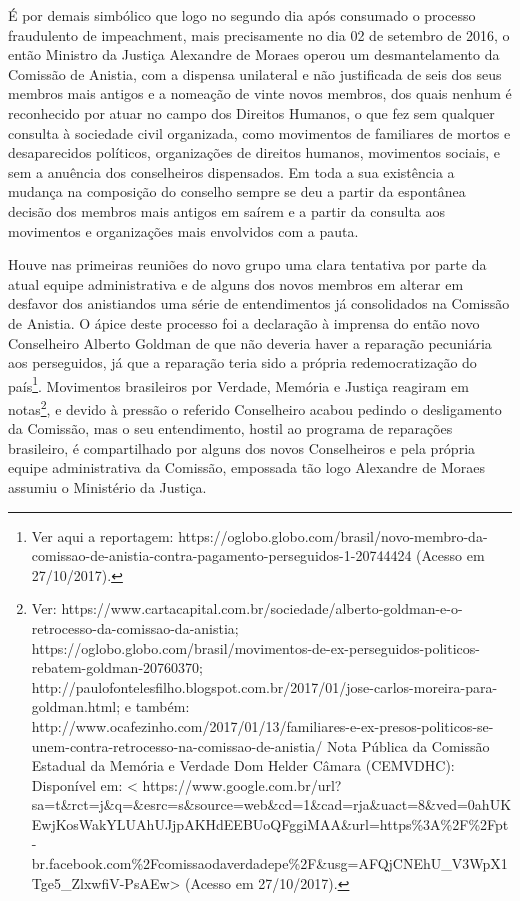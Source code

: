 É por demais simbólico que logo no segundo dia após consumado o processo
fraudulento de impeachment, mais precisamente no dia 02 de setembro de
2016, o então Ministro da Justiça Alexandre de Moraes operou um
desmantelamento da Comissão de Anistia, com a dispensa unilateral e não
justificada de seis dos seus membros mais antigos e a nomeação de vinte
novos membros, dos quais nenhum é reconhecido por atuar no campo dos
Direitos Humanos, o que fez sem qualquer consulta à sociedade civil
organizada, como movimentos de familiares de mortos e desaparecidos
políticos, organizações de direitos humanos, movimentos sociais, e sem a
anuência dos conselheiros dispensados. Em toda a sua existência a
mudança na composição do conselho sempre se deu a partir da espontânea
decisão dos membros mais antigos em saírem e a partir da consulta aos
movimentos e organizações mais envolvidos com a pauta.

Houve nas primeiras reuniões do novo grupo uma clara tentativa por parte
da atual equipe administrativa e de alguns dos novos membros em alterar
em desfavor dos anistiandos uma série de entendimentos já consolidados
na Comissão de Anistia. O ápice deste processo foi a declaração à
imprensa do então novo Conselheiro Alberto Goldman de que não deveria
haver a reparação pecuniária aos perseguidos, já que a reparação teria
sido a própria redemocratização do país\footnote{Ver aqui a reportagem:
  https://oglobo.globo.com/brasil/novo-membro-da-comissao-de-anistia-contra-pagamento-perseguidos-1-20744424
  (Acesso em 27/10/2017).}. Movimentos brasileiros por Verdade, Memória
e Justiça reagiram em notas\footnote{Ver:
  https://www.cartacapital.com.br/sociedade/alberto-goldman-e-o-retrocesso-da-comissao-da-anistia;
  https://oglobo.globo.com/brasil/movimentos-de-ex-perseguidos-politicos-rebatem-goldman-20760370;
  http://paulofontelesfilho.blogspot.com.br/2017/01/jose-carlos-moreira-para-goldman.html;
  e também:
  http://www.ocafezinho.com/2017/01/13/familiares-e-ex-presos-politicos-se-unem-contra-retrocesso-na-comissao-de-anistia/
  Nota Pública da Comissão Estadual da Memória e Verdade Dom Helder
  Câmara (CEMVDHC): Disponível em: \textless{}
  https://www.google.com.br/url?sa=t\&rct=j\&q=\&esrc=s\&source=web\&cd=1\&cad=rja\&uact=8\&ved=0ahUKEwjKosWakYLUAhUJjpAKHdEEBUoQFggiMAA\&url=https\%3A\%2F\%2Fpt-br.facebook.com\%2Fcomissaodaverdadepe\%2F\&usg=AFQjCNEhU\_V3WpX1Tge5\_ZlxwfiV-PsAEw\textgreater{}
  (Acesso em 27/10/2017).}, e devido à pressão o referido Conselheiro
acabou pedindo o desligamento da Comissão, mas o seu entendimento,
hostil ao programa de reparações brasileiro, é compartilhado por alguns
dos novos Conselheiros e pela própria equipe administrativa da Comissão,
empossada tão logo Alexandre de Moraes assumiu o Ministério da Justiça.

